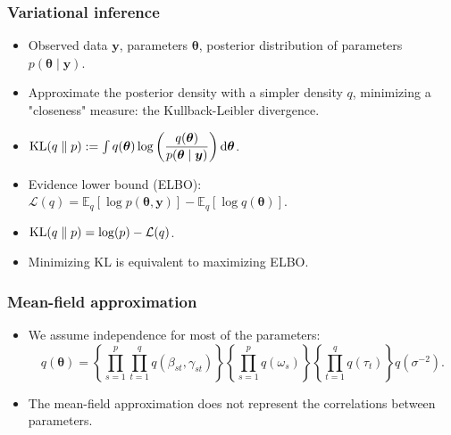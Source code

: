 \documentclass{beamer}
\DeclareMathOperator*{\KL}{{\rm KL}}
\begin{document}
\begin{frame}
\frametitle{Variational inference}
\begin{itemize}
\item Observed data $\boldsymbol{y}$, parameters $\boldsymbol{\theta}$, posterior distribution of parameters $p(\boldsymbol{\theta} \mid \boldsymbol{y})$.
\item Approximate the posterior density with a simpler density $q$, minimizing a "closeness" measure: the Kullback-Leibler divergence.
\item $\KL(q\parallel p) := \int q(\boldsymbol{\theta})\log \left(\dfrac{q(\boldsymbol{\theta})}{p(\boldsymbol{\theta} \mid \boldsymbol{y})}\right) \mathrm{d}\boldsymbol{\theta}$.
\item Evidence lower bound (ELBO): $\mathcal{L}(q) = \mathbb{E}_q\left[\log p(\boldsymbol{\theta},\boldsymbol{y})\right] - \mathbb{E}_q\left[\log q(\boldsymbol{\theta})\right]$.
\item $\KL(q\parallel p) = \log(p) - \mathcal{L}(q)$.
\item Minimizing KL is equivalent to maximizing ELBO.
\end{itemize}
\end{frame}

\begin{frame}
\frametitle{Mean-field approximation}
\begin{itemize}
\item We assume independence for most of the parameters:
$$
q(\boldsymbol{\theta}) = \left\lbrace\prod_{s=1}^p\prod_{t=1}^qq(\beta_{st},\gamma_{st})\right\rbrace\left\lbrace\prod_{s=1}^pq(\omega_s)\right\rbrace\left\lbrace\prod_{t=1}^qq(\tau_t)\right\rbrace q(\sigma^{-2}).
$$
\item The mean-field approximation does not represent the correlations between parameters.
\end{itemize}
\begin{figure}
\centering
{}\end{figure}
\end{frame}
\end{document}
